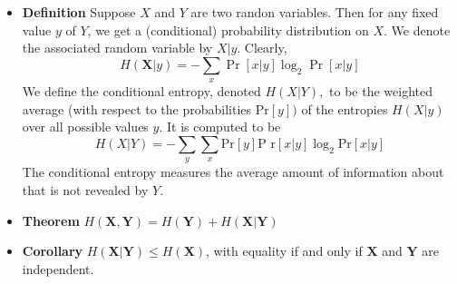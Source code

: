 \begin{itemize}
  \item \textbf{Definition} Suppose $X$ and $Y$ are two randon variables. Then for any fixed value $y$ of $Y$, we get a (conditional) probability distribution on $X$. We denote the associated random variable by $X | y .$ Clearly,
  $$
    H(\mathbf{X} | y)=-\sum_{x} \operatorname{Pr}[x | y] \log _{2} \operatorname{Pr}[x | y]
  $$
  We define the conditional entropy, denoted $H(X | Y),$ to be the weighted average (with respect to the probabilities $\text{Pr}[y])$ of the entropies $H(X | y)$ over all possible values $y$. It is computed to be
  $$
    H (X | Y)=-\sum_{y} \sum_{x} \text{Pr}[y] \text{P r}[x | y] \log _{2} \text{Pr}[x | y]
  $$
  The conditional entropy measures the average amount of information about that is not revealed by $Y$.
  \item \textbf{Theorem} $H(\mathbf{X}, \mathbf{Y})=H(\mathbf{Y})+H(\mathbf{X} | \mathbf{Y})$
  \item \textbf{Corollary} $H(\mathbf{X} | \mathbf{Y}) \leq H(\mathbf{X})$, with equality if and only if $\mathbf{X}$ and $\mathbf{Y}$ are independent.
\end{itemize}

